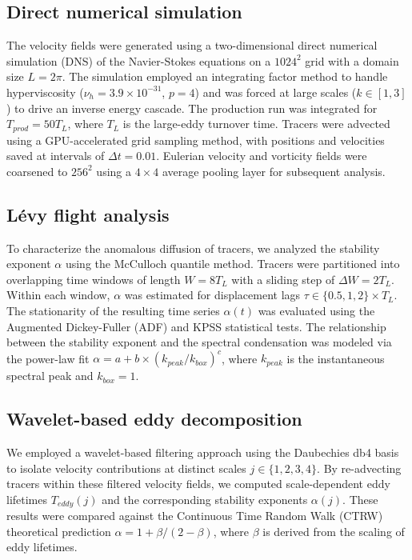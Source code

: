 \documentclass[]{article}
\begin{document}
\subsection{Direct numerical simulation}
The velocity fields were generated using a two-dimensional direct numerical simulation (DNS) of the Navier-Stokes equations on a $1024^2$ grid with a domain size $L=2\pi$. The simulation employed an integrating factor method to handle hyperviscosity ($\nu_h = 3.9 \times 10^{-31}$, $p=4$) and was forced at large scales ($k \in [1, 3]$) to drive an inverse energy cascade. The production run was integrated for $T_{prod} = 50 T_L$, where $T_L$ is the large-eddy turnover time. Tracers were advected using a GPU-accelerated grid sampling method, with positions and velocities saved at intervals of $\Delta t = 0.01$. Eulerian velocity and vorticity fields were coarsened to $256^2$ using a $4 \times 4$ average pooling layer for subsequent analysis.

\subsection{Lévy flight analysis}
To characterize the anomalous diffusion of tracers, we analyzed the stability exponent $\alpha$ using the McCulloch quantile method. Tracers were partitioned into overlapping time windows of length $W = 8 T_L$ with a sliding step of $\Delta W = 2 T_L$. Within each window, $\alpha$ was estimated for displacement lags $\tau \in \{0.5, 1, 2\} \times T_L$. The stationarity of the resulting time series $\alpha(t)$ was evaluated using the Augmented Dickey-Fuller (ADF) and KPSS statistical tests. The relationship between the stability exponent and the spectral condensation was modeled via the power-law fit $\alpha = a + b \times (k_{peak}/k_{box})^c$, where $k_{peak}$ is the instantaneous spectral peak and $k_{box}=1$.

\subsection{Wavelet-based eddy decomposition}
We employed a wavelet-based filtering approach using the Daubechies db4 basis to isolate velocity contributions at distinct scales $j \in \{1, 2, 3, 4\}$. By re-advecting tracers within these filtered velocity fields, we computed scale-dependent eddy lifetimes $T_{eddy}(j)$ and the corresponding stability exponents $\alpha(j)$. These results were compared against the Continuous Time Random Walk (CTRW) theoretical prediction $\alpha = 1 + \beta/(2-\beta)$, where $\beta$ is derived from the scaling of eddy lifetimes.
\end{document}
